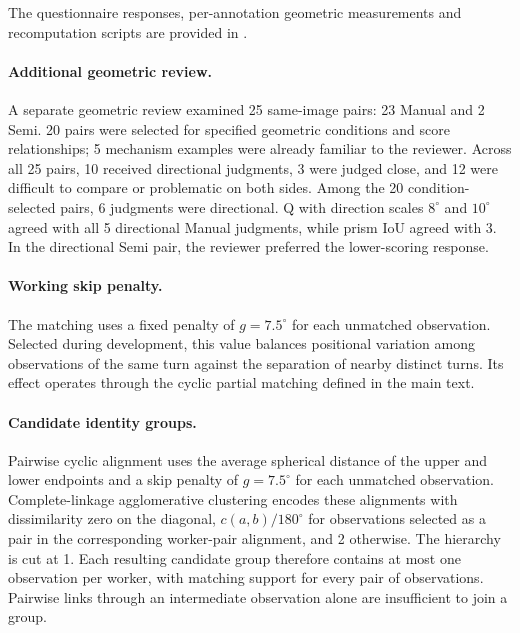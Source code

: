 The questionnaire responses, per-annotation geometric measurements and recomputation scripts are provided in .

\paragraph{Additional geometric review.}
A separate geometric review examined 25 same-image pairs: 23 Manual and 2 Semi. 20 pairs were selected for specified geometric conditions and score relationships; 5 mechanism examples were already familiar to the reviewer. Across all 25 pairs, 10 received directional judgments, 3 were judged close, and 12 were difficult to compare or problematic on both sides. Among the 20 condition-selected pairs, 6 judgments were directional. Q with direction scales \(8^\circ\) and \(10^\circ\) agreed with all 5 directional Manual judgments, while prism IoU agreed with 3. In the directional Semi pair, the reviewer preferred the lower-scoring response.

\paragraph{Working skip penalty.}
The matching uses a fixed penalty of \(g=7.5^\circ\) for each unmatched observation. Selected during development, this value balances positional variation among observations of the same turn against the separation of nearby distinct turns. Its effect operates through the cyclic partial matching defined in the main text.

\paragraph{Candidate identity groups.}
Pairwise cyclic alignment uses the average spherical distance of the upper
and lower endpoints and a skip penalty of \(g=7.5^\circ\) for each unmatched
observation. Complete-linkage agglomerative clustering encodes these
alignments with dissimilarity zero on the diagonal, \(c(a,b)/180^\circ\) for
observations selected as a pair in the corresponding worker-pair alignment,
and 2 otherwise. The hierarchy is cut at 1. Each resulting candidate group
therefore contains at most one observation per worker, with matching support
for every pair of observations. Pairwise links through an intermediate
observation alone are insufficient to join a group.

